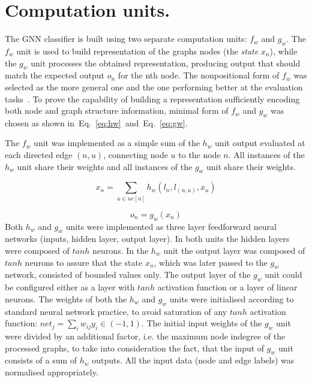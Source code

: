 \documentclass[a4paper, 11pt, twocolumn]{spie}  %
\begin{document}
\section{Computation units.}
The GNN classifier is built using two separate computation units: $f_w$ and $g_w$. The $f_w$ unit is used to build representation of the graphs nodes (the \emph{state} $x_n$), while the $g_w$ unit processes the obtained representation, producing output that should match the expected output $o_n$ for the nth node. The nonpositional form of $f_w$ was selected as the more general one and the one performing better at the evaluation tasks~. To prove the capability of building a representation sufficiently encoding both node and graph structure information, minimal form of $f_w$ and $g_w$ was chosen as shown in~Eq.~\ref{eq:hw}~and~Eq.~\ref{eq:gw}.

 \noindent
The $f_w$ unit was implemented as a simple sum of the $h_w$ unit output evaluated at each directed edge $(n, u)$, connecting node $u$ to the node $n$. All instances of the $h_w$ unit share their weights and all instances of the $g_w$ unit share their weights. 


\begin{equation}
x_n = \sum_{u \in ne[n]} h_w(l_n, l_{(n, u)}, x_u)
\label{eq:hw}
\end{equation}

\begin{equation}
o_n = g_w(x_n)
\label{eq:gw}
\end{equation}
Both $h_w$ and $g_w$ units were implemented as three layer feedforward neural networks (inputs, hidden layer, output layer). In both units the hidden layers were composed of $tanh$ neurons. In the $h_w$ unit the output layer was composed of $tanh$ neurons to assure that the state $x_n$, which was later passed to the $g_w$ network, consisted of bounded values only. The output layer of the $g_w$ unit could be configured either as a layer with $tanh$ activation function or a layer of linear neurons. The weights of both the $h_w$ and $g_w$ units were initialised according to standard neural network practice, to avoid saturation of any $tanh$ activation function: $net_j = \sum_i w_{ij} y_i \in (-1, 1)$. The initial input weights of the $g_w$ unit were divided by an additional factor, i.e. the maximum node indegree of the processed graphs, to take into consideration the fact, that the input of $g_w$ unit consists of a sum of $h_w$ outputs. All the input data (node and edge labels) was normalised appropriately.
\end{document}
